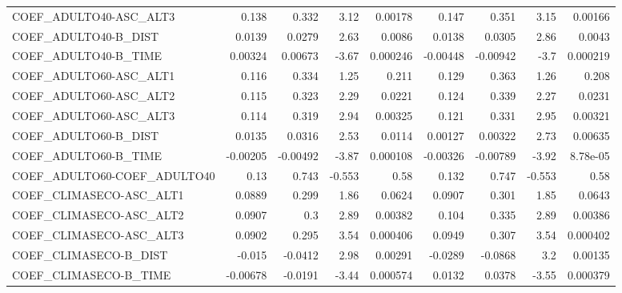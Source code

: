 \begin{tabular}{lrrrrrrrr}
COEF\_ADULTO40-ASC\_ALT3            &       0.138 &        0.332 &    3.12 &  0.00178 &      0.147 &       0.351 &         3.15 &       0.00166 \\
COEF\_ADULTO40-B\_DIST              &      0.0139 &       0.0279 &    2.63 &   0.0086 &     0.0138 &      0.0305 &         2.86 &        0.0043 \\
COEF\_ADULTO40-B\_TIME              &     0.00324 &      0.00673 &   -3.67 & 0.000246 &   -0.00448 &    -0.00942 &         -3.7 &      0.000219 \\
COEF\_ADULTO60-ASC\_ALT1            &       0.116 &        0.334 &    1.25 &    0.211 &      0.129 &       0.363 &         1.26 &         0.208 \\
COEF\_ADULTO60-ASC\_ALT2            &       0.115 &        0.323 &    2.29 &   0.0221 &      0.124 &       0.339 &         2.27 &        0.0231 \\
COEF\_ADULTO60-ASC\_ALT3            &       0.114 &        0.319 &    2.94 &  0.00325 &      0.121 &       0.331 &         2.95 &       0.00321 \\
COEF\_ADULTO60-B\_DIST              &      0.0135 &       0.0316 &    2.53 &   0.0114 &    0.00127 &     0.00322 &         2.73 &       0.00635 \\
COEF\_ADULTO60-B\_TIME              &    -0.00205 &     -0.00492 &   -3.87 & 0.000108 &   -0.00326 &    -0.00789 &        -3.92 &      8.78e-05 \\
COEF\_ADULTO60-COEF\_ADULTO40       &        0.13 &        0.743 &  -0.553 &     0.58 &      0.132 &       0.747 &       -0.553 &          0.58 \\
COEF\_CLIMASECO-ASC\_ALT1           &      0.0889 &        0.299 &    1.86 &   0.0624 &     0.0907 &       0.301 &         1.85 &        0.0643 \\
COEF\_CLIMASECO-ASC\_ALT2           &      0.0907 &          0.3 &    2.89 &  0.00382 &      0.104 &       0.335 &         2.89 &       0.00386 \\
COEF\_CLIMASECO-ASC\_ALT3           &      0.0902 &        0.295 &    3.54 & 0.000406 &     0.0949 &       0.307 &         3.54 &      0.000402 \\
COEF\_CLIMASECO-B\_DIST             &      -0.015 &      -0.0412 &    2.98 &  0.00291 &    -0.0289 &     -0.0868 &          3.2 &       0.00135 \\
COEF\_CLIMASECO-B\_TIME             &    -0.00678 &      -0.0191 &   -3.44 & 0.000574 &     0.0132 &      0.0378 &        -3.55 &      0.000379 \\

\end{tabular}

